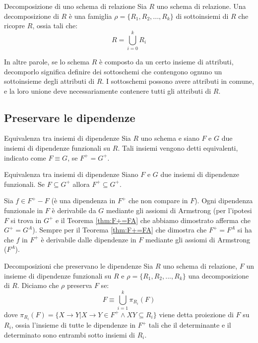 \begin{Definition}{Decomposizione di uno schema di relazione}{}
    Sia $R$ uno schema di relazione. Una decomposizione di $R$ è una famiglia $\rho=\{R_1, R_2 ,..., R_k\}$ di sottoinsiemi di $R$ che ricopre $R$, ossia tali che:
    \begin{equation*}
        R=\bigcup_{i=0}^kR_i
    \end{equation*}
    
    In altre parole, se lo schema $R$ è composto da un certo insieme di attributi, decomporlo significa definire dei sottoschemi che contengono ognuno un sottoinsieme degli attributi di $R$. I sottoschemi possono avere attributi in comune, e la loro unione deve necessariamente contenere tutti gli attributi di $R$.
\end{Definition}

\subsection{Preservare le dipendenze}
\begin{Definition}{Equivalenza tra insiemi di dipendenze}{}
    Sia $R$ uno schema e siano $F$ e $G$ due insiemi di dipendenze funzionali su $R$. Tali insiemi vengono detti equivalenti, indicato come $F\equiv G$, se $F^+=G^+$.
\end{Definition}

\begin{Lemma}{Equivalenza tra insiemi di dipendenze}{}\label{lemma:equivalenza-dipendenze}
    Siano $F$ e $G$ due insiemi di dipendenze funzionali. Se $F\subseteq G^+$ allora $F^+\subseteq G^+$.
    \begin{demonstration}
        Sia $f \in F^+-F$ (è una dipendenza in $F^+$ che non compare in $F$). Ogni dipendenza funzionale in $F$ è derivabile da $G$ mediante gli assiomi di Armstrong (per l'ipotesi $F$ si trova in $G^+$ e il Teorema \ref{thm:F+=FA} che abbiamo dimostrato afferma che $G^+= G^A$). Sempre per il Teorema \ref{thm:F+=FA} che dimostra che $F^+= F^A$ si ha che $f$ in $F^+$ è derivabile dalle dipendenze in $F$ mediante gli assiomi di Armstrong ($F^A$).
    \end{demonstration}
\end{Lemma}

\begin{Definition}{Decomposizioni che preservano le dipendenze}{}
    Sia $R$ uno schema di relazione, $F$ un insieme di dipendenze funzionali su $R$ e $\rho=\{R_1, R_2,..., R_k\}$ una decomposizione di $R$. Diciamo che $\rho$ preserva $F$ se:
    \begin{equation*}
        F\equiv \bigcup^k_{i=1}\pi_{R_i}(F)
    \end{equation*}
    dove $\pi_{R_i}(F)=\{X\to Y|X\to Y\in F^+\land XY\subseteq R_i\}$ viene detta proiezione di $F$ su $R_i$, ossia l'insieme di tutte le dipendenze in $F^+$ tali che il determinante e il determinato sono entrambi sotto insiemi di $R_i$.
\end{Definition}

